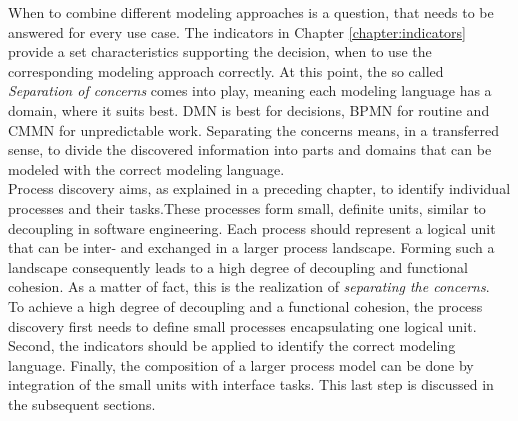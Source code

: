When to combine different modeling approaches is a question, that needs to be answered for every use case. The indicators in Chapter \ref{chapter:indicators} provide a set characteristics supporting the decision, when to use the corresponding modeling approach correctly. At this point, the so called \textit{Separation of concerns} \cite{BiardMauffBigandEtAl2015a} comes into play, meaning each modeling language has a domain, where it suits best. DMN is best for decisions, BPMN for routine and CMMN for unpredictable work. Separating the concerns means, in a transferred sense, to divide the discovered information into parts and domains that can be modeled with the correct modeling language. \\
Process discovery aims, as explained in a preceding chapter, to identify individual processes and their tasks.\newpage These processes form small, definite units, similar to decoupling in software engineering. Each process should represent a logical unit that can be inter- and exchanged in a larger process landscape. Forming such a landscape consequently leads to a high degree of decoupling and functional cohesion. As a matter of fact, this is the  realization of \textit{separating the concerns}. \\
To achieve a high degree of decoupling and a functional cohesion, the process discovery first needs to define small processes encapsulating one logical unit. Second, the indicators should be applied to identify the correct modeling language. Finally, the composition of a larger process model can be done by integration of the small units with interface tasks. This last step is discussed in the subsequent sections. 
